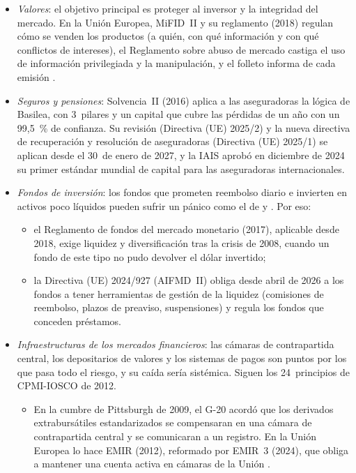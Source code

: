\documentclass[11pt]{article}
\begin{document}
\begin{itemize}
\item \emph{Valores}: el objetivo principal es proteger al inversor y la integridad del mercado. En la Unión Europea, MiFID~II y su reglamento (2018) regulan cómo se venden los productos (a quién, con qué información y con qué conflictos de intereses), el Reglamento sobre abuso de mercado castiga el uso de información privilegiada y la manipulación, y el folleto informa de cada emisión\nocite{UE2014MiFID2} .
\item \emph{Seguros y pensiones}: Solvencia~II (2016) aplica a las aseguradoras la lógica de Basilea, con 3~pilares y un capital que cubre las pérdidas de un año con un 99,5~\% de confianza. Su revisión (Directiva (UE) 2025/2) y la nueva directiva de recuperación y resolución de aseguradoras (Directiva (UE) 2025/1) se aplican desde el 30~de enero de 2027, y la IAIS aprobó en diciembre de 2024 su primer estándar mundial de capital para las aseguradoras internacionales\nocite{EIOPA2026Solvencia,IAIS2024ICS}.
\item \emph{Fondos de inversión}: los fondos que prometen reembolso diario e invierten en activos poco líquidos pueden sufrir un pánico como el de  y . Por eso:
  \begin{itemize}
  \item el Reglamento de fondos del mercado monetario (2017), aplicable desde 2018, exige liquidez y diversificación tras la crisis de 2008, cuando un fondo de este tipo no pudo devolver el dólar invertido\nocite{UE2017FMM};
  \item la Directiva (UE) 2024/927 (AIFMD~II) obliga desde abril de 2026 a los fondos a tener herramientas de gestión de la liquidez (comisiones de reembolso, plazos de preaviso, suspensiones) y regula los fondos que conceden préstamos\nocite{UE2024AIFMD2}.
  \end{itemize}
\item \emph{Infraestructuras de los mercados financieros}: las cámaras de contrapartida central, los depositarios de valores y los sistemas de pagos son puntos por los que pasa todo el riesgo, y su caída sería sistémica. Siguen los 24~principios de CPMI-IOSCO de 2012\nocite{CPMIIOSCO2012PFMI}.
  \begin{itemize}
  \item En la cumbre de Pittsburgh de 2009, el G-20 acordó que los derivados extrabursátiles estandarizados se compensaran en una cámara de contrapartida central y se comunicaran a un registro. En la Unión Europea lo hace EMIR (2012), reformado por EMIR~3 (2024), que obliga a mantener una cuenta activa en cámaras de la Unión\nocite{UE2012EMIR,UE2024EMIR3} .

\end{itemize}
\end{itemize}
\end{document}
